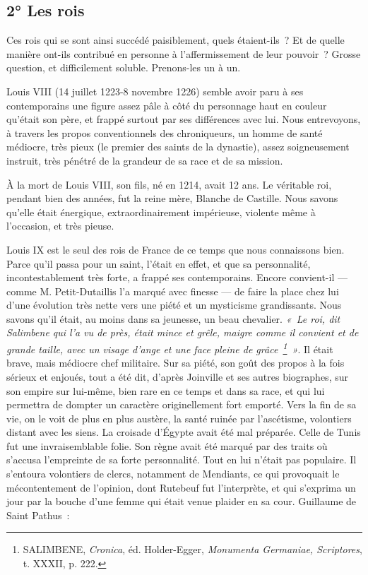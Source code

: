 \documentclass[french,twoside]{book} %
\begin{document}
\subsection[{2° Les rois}]{2° Les rois}
\label{c03b2}
\noindent Ces rois qui se sont ainsi succédé paisiblement, quels étaient-ils ? Et de quelle manière ont-ils contribué en personne à l’affermissement de leur pouvoir ? Grosse question, et difficilement soluble. Prenons-les un à un.\par
Louis VIII (14 juillet 1223-8 novembre 1226) semble avoir paru à ses contemporains une figure assez pâle à côté du personnage haut en couleur qu’était son père, et frappé surtout par ses différences avec lui. Nous entrevoyons, à travers les propos conventionnels des chroniqueurs, un homme de santé médiocre, très pieux (le premier des saints de la dynastie), assez soigneusement instruit, très pénétré de la grandeur de sa race et de sa mission.\par
À la mort de Louis VIII, son fils, né en 1214, avait 12 ans. Le véritable roi, pendant bien des années, fut la reine mère, Blanche de Castille. Nous savons qu’elle était énergique, extraordinairement impérieuse, violente même à l’occasion, et très pieuse.\par
Louis IX est le seul des rois de France de ce temps que nous connaissons bien. Parce qu’il passa pour un saint, l’était en effet, et que sa personnalité, incontestablement très forte, a frappé ses contemporains. Encore convient-il — comme M. Petit-Dutaillis l’a marqué avec finesse — de faire la place chez lui d’une évolution très nette vers une piété et un mysticisme grandissants. Nous savons qu’il était, au moins dans sa jeunesse, un beau chevalier. \emph{« Le roi, dit Salimbene qui l’a vu de près, était mince et grêle, maigre comme  
\label{p15} il convient et de grande taille, avec un visage d’ange et une face pleine de grâce \footnote{ SALIMBENE, {\itshape Cronica}, éd. Holder-Egger, {\itshape Monumenta Germaniae, Scriptores}, t. XXXII, p. 222.} »}. Il était brave, mais médiocre chef militaire. Sur sa piété, son goût des propos à la fois sérieux et enjoués, tout a été dit, d’après Joinville et ses autres biographes, sur son empire sur lui-même, bien rare en ce temps et dans sa race, et qui lui permettra de dompter un caractère originellement fort emporté. Vers la fin de sa vie, on le voit de plus en plus austère, la santé ruinée par l’ascétisme, volontiers distant avec les siens. La croisade d’Égypte avait été mal préparée. Celle de Tunis fut une invraisemblable folie. Son règne avait été marqué par des traits où s’accusa l’empreinte de sa forte personnalité. Tout en lui n’était pas populaire. Il s’entoura volontiers de clercs, notamment de Mendiants, ce qui provoquait le mécontentement de l’opinion, dont Rutebeuf fut l’interprète, et qui s’exprima un jour par la bouche d’une femme qui était venue plaider en sa cour. Guillaume de Saint Pathus :\par
\end{document}
